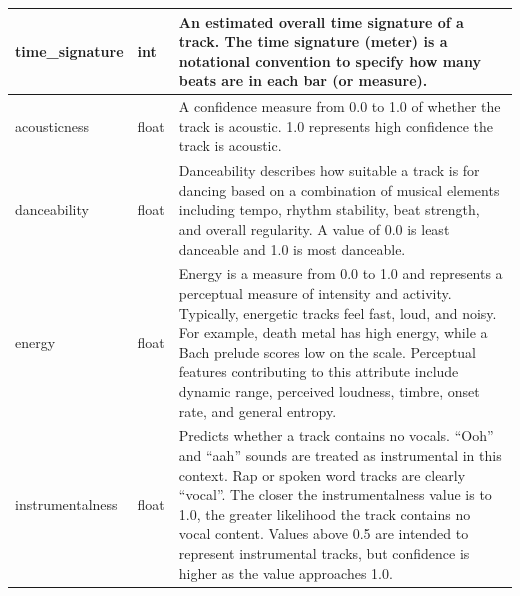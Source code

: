 \begin{longtable}{|p{3cm}|p{1.6cm}|p{7cm}|}
time\_signature  & int          & An estimated overall time signature of a track. The time signature (meter) is a notational convention to specify how many beats are in each bar (or measure).                                                                                                                                                                                                                                                                                                                                                      \\ \hline
acousticness     & float        & A confidence measure from 0.0 to 1.0 of whether the track is acoustic. 1.0 represents high confidence the track is acoustic.                                                                                                                                                                                                                                                                                                                                                                                       \\ \hline
danceability     & float        & Danceability describes how suitable a track is for dancing based on a combination of musical elements including tempo, rhythm stability, beat strength, and overall regularity. A value of 0.0 is least danceable and 1.0 is most danceable.                                                                                                                                                                                                                                                                       \\ \hline
energy           & float        & Energy is a measure from 0.0 to 1.0 and represents a perceptual measure of intensity and activity. Typically, energetic tracks feel fast, loud, and noisy. For example, death metal has high energy, while a Bach prelude scores low on the scale. Perceptual features contributing to this attribute include dynamic range, perceived loudness, timbre, onset rate, and general entropy.                                                                                                                          \\ \hline
instrumentalness & float        & Predicts whether a track contains no vocals. “Ooh” and “aah” sounds are treated as instrumental in this context. Rap or spoken word tracks are clearly “vocal”. The closer the instrumentalness value is to 1.0, the greater likelihood the track contains no vocal content. Values above 0.5 are intended to represent instrumental tracks, but confidence is higher as the value approaches 1.0.                                                                                                                 \\ \hline

\end{longtable}
